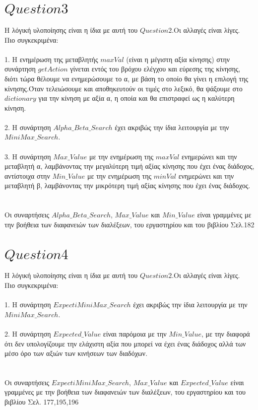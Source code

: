 \documentclass[10pt]{article}
\begin{document}
\section*{$Question 3$}
\hspace{10mm}
Η λόγική υλοποίησης είναι η ίδια με αυτή του $Question2$.Οι αλλαγές είναι λίγες. \\ Πιο συγκεκριμένα: \\ \\
1. Η ενημέρωση της μεταβλητής $maxVal$ (είναι η μέγιστη αξία κίνησης) στην συνάρτηση $getAction$ γίνεται εντός του βρόχου ελέγχου και εύρεσης της κίνησης, διότι τώρα θέλουμε να ενημερώσουμε το α, με βάση το οποίο θα γίνει η επιλογή της κίνησης.Όταν τελειώσουμε και αποθηκευτούν οι τιμές στο λεξικό, θα ψάξουμε στο $dictionary$ για την κίνηση με αξία α, η οποία και θα επιστραφεί ως η καλύτερη κίνηση. \\ \\
2. Η συνάρτηση $Alpha\_Beta\_Search$ έχει ακριβώς την ίδια λειτουργία με την $MiniMax\_Search$. \\ \\
3. Η συνάρτηση $Max\_Value$ με την ενημέρωση της $maxVal$ ενημερώνει και την μεταβλητή α, λαμβάνοντας την μεγαλύτερη τιμή αξίας κίνησης που έχει ένας διάδοχος, αντίστοιχα στην $Min\_Value$  με την ενημέρωση της $minVal$ ενημερώνει και την μεταβλητή β, λαμβάνοντας την μικρότερη τιμή αξίας κίνησης που έχει ένας διάδοχος. \\ \\ \\
Οι συναρτήσεις $Alpha\_Beta\_Search$, $Max\_Value$ και $Min\_Value$ είναι γραμμένες με την  βοήθεια των διαφανειών των διαλέξεων, του εργαστηρίου και του βιβλίου Σελ.182 \\
\section*{$Question 4$}
\hspace{10mm}
Η λόγική υλοποίησης είναι η ίδια με αυτή του $Question2$.Οι αλλαγές είναι λίγες. \\ Πιο συγκεκριμένα: \\ \\
1. Η συνάρτηση $ExpectiMiniMax\_Search$ έχει ακριβώς την ίδια λειτουργία με την $MiniMax\_Search$. \\ \\
2. Η συνάρτηση $Expected\_Value$ είναι παρόμοια με την $Min\_Value$, με την διαφορά ότι δεν υπολογίζουμε την ελάχιστη αξία που μπορεί να έχει ένας διάδοχος αλλά των μέσο όρο των αξιών των κινήσεων των διαδόχων.
 \\ \\ \\
Οι συναρτήσεις $ExpectiMiniMax\_Search$, $Max\_Value$ και $Expected\_Value$ είναι γραμμένες με την  βοήθεια των διαφανειών των διαλέξεων, του εργαστηρίου και του βιβλίου Σελ. 177,195,196 
\\ \\
\end{document}
